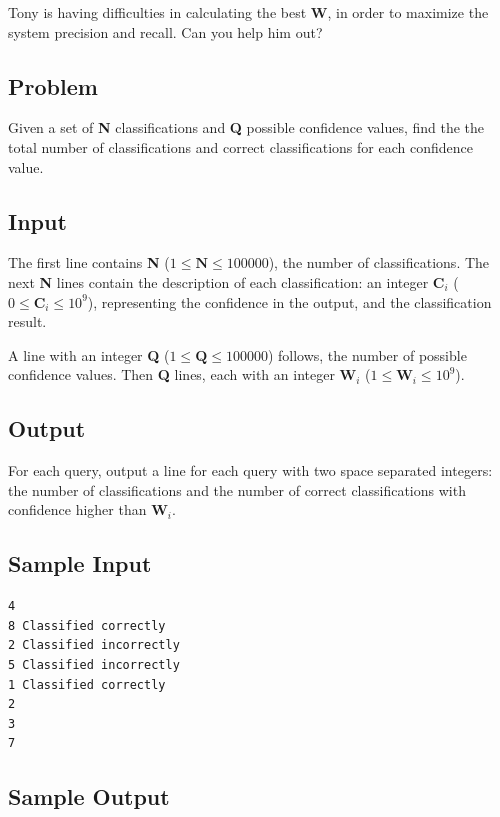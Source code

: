 \documentclass[11pt]{report}
\begin{document}
Tony is having difficulties in calculating the best \textbf{W}, in order to
maximize the system precision and recall. Can you help him out?

\subsection*{Problem}

Given a set of \textbf{N} classifications and \textbf{Q} possible confidence values, find the the total number of classifications and correct classifications for each confidence value.

\subsection*{Input}

The first line contains \textbf{N} ($1 \leq \textbf{N} \leq 100000$), the number
of classifications. The next \textbf{N} lines contain the description of each
classification: an integer $\mathbf{C}_i$ ($0 \leq \mathbf{C}_i \leq 10^9$),
representing the confidence in the output, and the classification result.

A line with an integer \textbf{Q} ($1 \leq \textbf{Q} \leq 100000$) follows, the
number of possible confidence values. Then \textbf{Q} lines, each with an
integer $\mathbf{W}_i$ ($1 \leq \mathbf{W}_i \leq 10^9$).

\subsection*{Output}

For each query, output a line for each query with two space separated integers: the number of classifications and the number of correct classifications with confidence higher than $\mathbf{W}_i$.

\subsection*{Sample Input}

\begin{verbatim}
4
8 Classified correctly
2 Classified incorrectly
5 Classified incorrectly
1 Classified correctly
2
3
7
\end{verbatim}

\subsection*{Sample Output}
\end{document}

